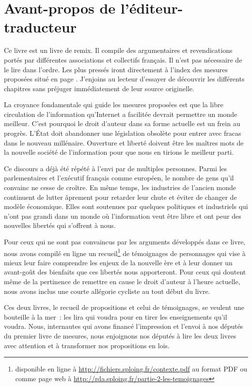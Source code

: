 \chapter*{Avant-propos de l'éditeur-traducteur}

Ce livre est un livre de remix. Il compile des argumentaires et revendications portés par différentes associations et collectifs français. Il n'est pas nécessaire de le lire dans l'ordre. Les plus pressés iront directement à l'index des mesures proposées situé en page \pageref{index}. J'enjoins au lecteur d'essayer de découvrir les différents chapitres sans préjuger immédiatement de leur source originelle.

La croyance fondamentale qui guide les mesures proposées est que la libre circulation de l'information qu'Internet a facilitée devrait permettre un monde meilleur. C'est pourquoi le droit d'auteur dans sa forme actuelle est un frein au progrès. L'État doit abandonner une législation obsolète pour entrer avec fracas dans le nouveau millénaire. Ouverture et liberté doivent être les maîtres mots de la nouvelle société de l'information pour que nous en tirions le meilleur parti. 

Ce discours a déjà été répété à l'envi par de multiples personnes. Parmi les parlementaires et l'exécutif français comme européen, le nombre de gens qu'il convainc ne cesse de croître. En même temps, les industries de l'ancien monde continuent de lutter âprement pour retarder leur chute et éviter de changer de modèle économique. Elles sont soutenues par quelques politiques et industriels qui n'ont pas grandi dans un monde où l'information veut être libre et ont peur des nouvelles libertés qui s'offrent à nous. 

Pour ceux qui ne sont pas convaincus par les arguments développés dans ce livre, nous avons compilé en ligne un recueil\footnote{disponible en ligne à \url{http://fichiers.sploing.fr/contexte.pdf} au format PDF ou comme page web à \url{http://rda.sploing.fr/partie-2-les-temoignages}} de témoignages de personnages qui vise à mieux leur faire comprendre les enjeux de la nouvelle ère et à leur donner un avant-goût des bienfaits que ces libertés nous apporteront. Pour ceux qui doutent même de la pertinence de remettre en cause le droit d'auteur à l'heure actuelle, nous avons inclus une courte allégorie cycliste au tout début du livre.

Ces deux livres, le recueil de propositions et celui de témoignages, se veulent une bouteille à la mer~: les lira qui voudra pour en tirer les enseignements qu'il voudra. Nous, internautes qui avons financé l'impression et l'envoi à nos députés du premier livre de mesures, nous enjoignons nos députés à lire les deux livres avec attention et à transformer nos propositions en lois. 
